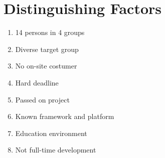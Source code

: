 \documentclass{article}
\begin{document}
\section{Distinguishing Factors}


\begin{enumerate}
\item 14 persons in 4 groups
\item Diverse target group
\item No on-site costumer
\item Hard deadline
\item Passed on project
\item Known framework and platform
\item Education environment
\item Not full-time development
\end{enumerate}
\end{document}
